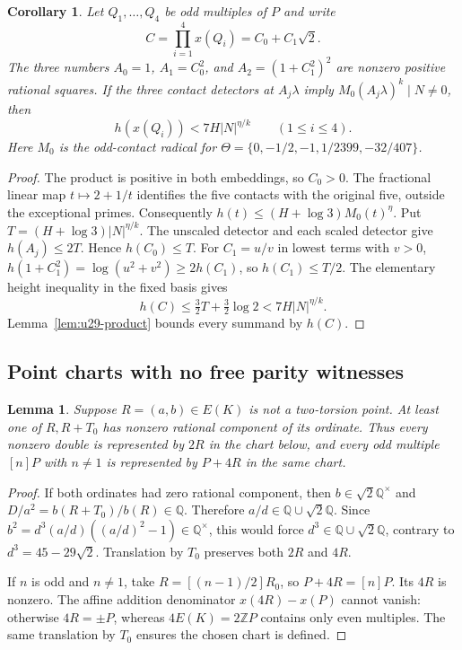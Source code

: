 \documentclass[11pt,a4paper]{article}
\newtheorem{lemma}[theorem]{Lemma}
\newtheorem{corollary}[theorem]{Corollary}
\theoremstyle{definition}
\theoremstyle{remark}
\begin{document}
\begin{corollary}\label{cor:u29-scales}
Let $Q_1,\ldots,Q_4$ be odd multiples of $P$ and write
\[
 C=\prod_{i=1}^4x(Q_i)=C_0+C_1\sqrt2.
\]
The three numbers $A_0=1$, $A_1=C_0^2$, and
$A_2=(1+C_1^2)^2$ are nonzero positive rational squares.
If the three contact detectors at $A_j\lambda$ imply
$M_0(A_j\lambda)^k\mid N\ne0$, then
\[
                         h(x(Q_i))<7H|N|^{\eta/k}
                         \qquad(1\le i\le4).
\]
Here $M_0$ is the odd-contact radical for
$\Theta=\{0,-1/2,-1,1/2399,-32/407\}$.
\end{corollary}
\begin{proof}
The product is positive in both embeddings, so $C_0>0$.
The fractional linear map $t\mapsto2+1/t$ identifies the five
contacts with the original five, outside the exceptional primes.
Consequently $h(t)\le(H+\log3)M_0(t)^{\eta}$.  Put
$T=(H+\log3)|N|^{\eta/k}$.  The unscaled detector and each scaled
detector give $h(A_j)\le2T$.  Hence $h(C_0)\le T$.
For $C_1=u/v$ in lowest terms with $v>0$,
$h(1+C_1^2)=\log(u^2+v^2)\ge2h(C_1)$, so $h(C_1)\le T/2$.
The elementary height inequality in the fixed basis gives
\[
 h(C)\le\tfrac32T+\tfrac32\log2<7H|N|^{\eta/k}.
\]
Lemma~\ref{lem:u29-product} bounds every summand by $h(C)$.
\end{proof}

\subsection{Point charts with no free parity witnesses}

\begin{lemma}\label{lem:u29-chart}
Suppose $R=(a,b)\in E(K)$ is not a two-torsion point.  At least one
of $R,R+T_0$ has nonzero rational component of its ordinate.
Thus every nonzero double is represented by $2R$ in the chart below,
and every odd multiple $[n]P$ with $n\ne1$ is represented by
$P+4R$ in the same chart.
\end{lemma}
\begin{proof}
If both ordinates had zero rational component, then
$b\in\sqrt2\mathbb Q^\times$ and
$D/a^2=b(R+T_0)/b(R)\in\mathbb Q$.  Therefore
$a/d\in\mathbb Q\cup\sqrt2\mathbb Q$.  Since
$b^2=d^3(a/d)((a/d)^2-1)\in\mathbb Q^\times$, this would force
$d^3\in\mathbb Q\cup\sqrt2\mathbb Q$, contrary to
$d^3=45-29\sqrt2$.  Translation by $T_0$ preserves both $2R$ and
$4R$.

If $n$ is odd and $n\ne1$, take $R=[(n-1)/2]R_0$, so
$P+4R=[n]P$.  Its $4R$ is nonzero.  The affine addition denominator
$x(4R)-x(P)$ cannot vanish: otherwise $4R=\pm P$, whereas
$4E(K)=2\mathbb ZP$ contains only even multiples.  The same
translation by $T_0$ ensures the chosen chart is defined.
\end{proof}
\end{document}

